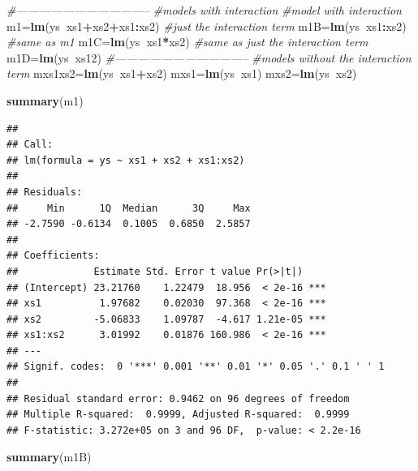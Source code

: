 \documentclass[
]{book}
\newenvironment{Shaded}{\begin{snugshade}}{\end{snugshade}}
\newcommand{\CommentTok}[1]{\textcolor[rgb]{0.56,0.35,0.01}{\textit{#1}}}
\newcommand{\KeywordTok}[1]{\textcolor[rgb]{0.13,0.29,0.53}{\textbf{#1}}}
\newcommand{\NormalTok}[1]{#1}
\newcommand{\OperatorTok}[1]{\textcolor[rgb]{0.81,0.36,0.00}{\textbf{#1}}}
\begin{document}
\begin{Shaded}
\begin{Highlighting}[]
\CommentTok{#-----------------------------------}
\CommentTok{#models with interaction}
\CommentTok{#model with interaction}
\NormalTok{m1=}\KeywordTok{lm}\NormalTok{(ys}\OperatorTok{~}\NormalTok{xs1}\OperatorTok{+}\NormalTok{xs2}\OperatorTok{+}\NormalTok{xs1}\OperatorTok{:}\NormalTok{xs2)}
\CommentTok{#just the interaction term}
\NormalTok{m1B=}\KeywordTok{lm}\NormalTok{(ys}\OperatorTok{~}\NormalTok{xs1}\OperatorTok{:}\NormalTok{xs2)}
\CommentTok{#same as m1}
\NormalTok{m1C=}\KeywordTok{lm}\NormalTok{(ys}\OperatorTok{~}\NormalTok{xs1}\OperatorTok{*}\NormalTok{xs2)}
\CommentTok{#same as just the interaction term}
\NormalTok{m1D=}\KeywordTok{lm}\NormalTok{(ys}\OperatorTok{~}\NormalTok{xs12)}
\CommentTok{#-----------------------------------}
\CommentTok{#models without the interaction term}
\NormalTok{mxs1xs2=}\KeywordTok{lm}\NormalTok{(ys}\OperatorTok{~}\NormalTok{xs1}\OperatorTok{+}\NormalTok{xs2)}
\NormalTok{mxs1=}\KeywordTok{lm}\NormalTok{(ys}\OperatorTok{~}\NormalTok{xs1)}
\NormalTok{mxs2=}\KeywordTok{lm}\NormalTok{(ys}\OperatorTok{~}\NormalTok{xs2)}


\KeywordTok{summary}\NormalTok{(m1)}
\end{Highlighting}
\end{Shaded}

\begin{verbatim}
## 
## Call:
## lm(formula = ys ~ xs1 + xs2 + xs1:xs2)
## 
## Residuals:
##     Min      1Q  Median      3Q     Max 
## -2.7590 -0.6134  0.1005  0.6850  2.5857 
## 
## Coefficients:
##             Estimate Std. Error t value Pr(>|t|)    
## (Intercept) 23.21760    1.22479  18.956  < 2e-16 ***
## xs1          1.97682    0.02030  97.368  < 2e-16 ***
## xs2         -5.06833    1.09787  -4.617 1.21e-05 ***
## xs1:xs2      3.01992    0.01876 160.986  < 2e-16 ***
## ---
## Signif. codes:  0 '***' 0.001 '**' 0.01 '*' 0.05 '.' 0.1 ' ' 1
## 
## Residual standard error: 0.9462 on 96 degrees of freedom
## Multiple R-squared:  0.9999,	Adjusted R-squared:  0.9999 
## F-statistic: 3.272e+05 on 3 and 96 DF,  p-value: < 2.2e-16
\end{verbatim}

\begin{Shaded}
\begin{Highlighting}[]
\KeywordTok{summary}\NormalTok{(m1B)}
\end{Highlighting}
\end{Shaded}
\end{document}

